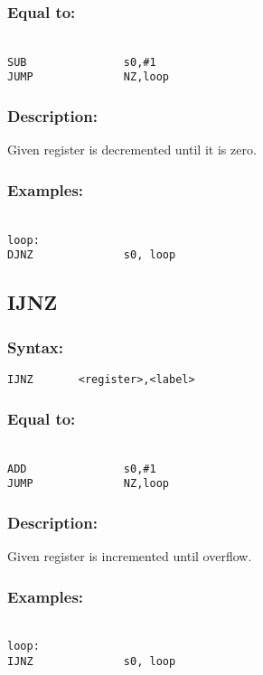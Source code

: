         \subsubsection{Equal to:}
        {
            ~\\
            \usecodefont
            \verb'SUB               s0,#1'\\
            \verb'JUMP              NZ,loop'\\
        }
        \subsubsection{Description:}
            Given register is decremented until it is zero.

        \subsubsection{Examples:}
        {
            ~\\
            \usecodefont
            \verb'loop:             '\\
            \verb'DJNZ              s0, loop'\\
        }

    \subsection{IJNZ}
        \subsubsection{Syntax:}
            \verb'IJNZ       <register>,<label>'

        \subsubsection{Equal to:}
        {
            ~\\
            \usecodefont
            \verb'ADD               s0,#1'\\
            \verb'JUMP              NZ,loop'\\
        }
        \subsubsection{Description:}
            Given register is incremented until overflow.

        \subsubsection{Examples:}
        {
            ~\\
            \usecodefont
            \verb'loop:             '\\
            \verb'IJNZ              s0, loop'\\
        }

